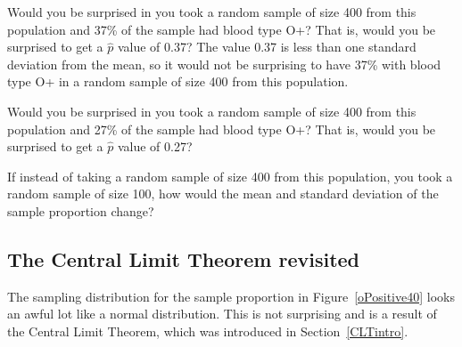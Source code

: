 \begin{examplewrap}
\begin{nexample}
{Would you be surprised in you took a random sample of size 400 from this population and 37\% of the sample had blood type O+?  That is, would you be surprised to get a $\hat{p}$ value of 0.37?}
The value 0.37 is less than one standard deviation from the mean, so it would not be surprising to have 37\% with blood type O+ in a random sample of size 400 from this population.
\end{nexample}
\end{examplewrap}

\begin{exercisewrap}
\begin{nexercise}
Would you be surprised in you took a random sample of size 400 from this population and 27\% of the sample had blood type O+?  That is, would you be surprised to get a $\hat{p}$ value of 0.27?\footnotemark
\end{nexercise}
\end{exercisewrap}

\begin{exercisewrap}
\begin{nexercise}
If instead of taking a random sample of size 400 from this population, you took a random sample of size 100, how would the mean and standard deviation of the sample proportion change?\footnotemark
\end{nexercise}
\end{exercisewrap}

\D{\newpage}

\subsection{The Central Limit Theorem revisited}

The sampling distribution for the sample proportion in
Figure~\ref{oPositive40} looks an awful lot like
a normal distribution. This is not surprising and is a result of the Central Limit Theorem, which was introduced in Section~\ref{CLTintro}.

